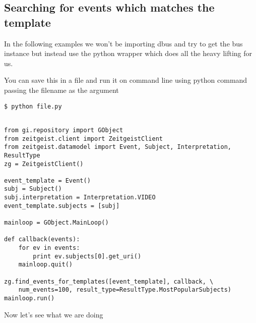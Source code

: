 \subsection{Searching for events which matches the template}

In the following examples we won't be importing dbus and try to get the bus instance 
but instead use the python wrapper which does all the heavy lifting for us.

You can save this in a file and run it on command line using python command passing 
the filename as the argument

\texttt{\$ python file.py}

\begin{center}
\begin{verbatim}

from gi.repository import GObject
from zeitgeist.client import ZeitgeistClient
from zeitgeist.datamodel import Event, Subject, Interpretation, ResultType
zg = ZeitgeistClient()

event_template = Event()
subj = Subject()
subj.interpretation = Interpretation.VIDEO
event_template.subjects = [subj]

mainloop = GObject.MainLoop()

def callback(events):
	for ev in events:
		print ev.subjects[0].get_uri()
	mainloop.quit()

zg.find_events_for_templates([event_template], callback, \
    num_events=100, result_type=ResultType.MostPopularSubjects)
mainloop.run()

\end{verbatim}
\end{center}

Now let's see what we are doing

